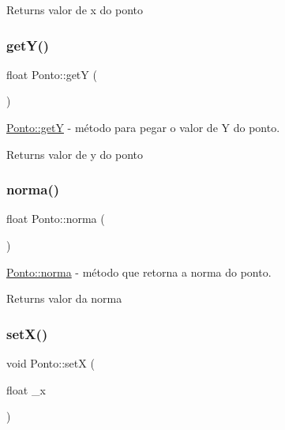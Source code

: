 \begin{DoxyReturn}{Returns}
valor de x do ponto 
\end{DoxyReturn}
\mbox{\label{classPonto_ab120600953e6544301223b9b05a43ee5}} 
\subsubsection{\texorpdfstring{get\+Y()}{getY()}}
{\footnotesize\ttfamily float Ponto\+::getY (\begin{DoxyParamCaption}{ }\end{DoxyParamCaption})}



\hyperlink{classPonto_ab120600953e6544301223b9b05a43ee5}{Ponto\+::getY} -\/ método para pegar o valor de Y do ponto. 

\begin{DoxyReturn}{Returns}
valor de y do ponto 
\end{DoxyReturn}
\mbox{\label{classPonto_a9b0ddbdddd05edbc4d45ef0671a628c6}} 
\subsubsection{\texorpdfstring{norma()}{norma()}}
{\footnotesize\ttfamily float Ponto\+::norma (\begin{DoxyParamCaption}{ }\end{DoxyParamCaption})}



\hyperlink{classPonto_a9b0ddbdddd05edbc4d45ef0671a628c6}{Ponto\+::norma} -\/ método que retorna a norma do ponto. 

\begin{DoxyReturn}{Returns}
valor da norma 
\end{DoxyReturn}
\mbox{\label{classPonto_a22129ad4dbf8019c479021d70a9f6774}} 
\subsubsection{\texorpdfstring{set\+X()}{setX()}}
{\footnotesize\ttfamily void Ponto\+::setX (\begin{DoxyParamCaption}\item[{float}]{\+\_\+x }\end{DoxyParamCaption})}



